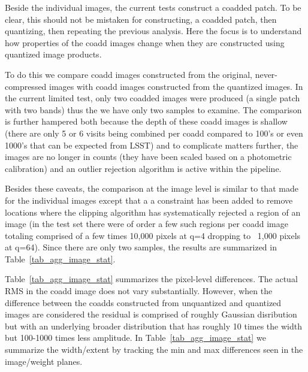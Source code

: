 Beside the individual images, the current tests construct a coadded patch.  
To be clear, this should not be mistaken for constructing, a coadded patch, 
then quantizing, then repeating the previous analysis.  Here the focus is to
understand how properties of the coadd images change when they are constructed
using quantized image products. 

To do this we compare coadd images constructed from the original, 
never-compressed images with coadd images constructed from the quantized images.
In the current limited test, only two coadded images were produced (a single patch 
with two bands) thus the we have only two samples to examine. 
The comparison is further hampered both because the depth of these coadd images 
is shallow (there are only 5 or 6 visits being combined per coadd compared to 100's 
or even 1000's that can be expected from LSST) and to complicate matters further,
the images are no longer in counts (they have been scaled based on a photometric
calibration) and an outlier rejection algorithm is active within the pipeline. 

Besides these caveats, the comparison at the image level is similar to that made for 
the individual images except that a a constraint has been added to 
remove locations where the clipping algorithm has systematically rejected a region 
of an image (in the test set there were of order a few such regions per coadd image
totaling comprised of a few times 10,000 pixels at q=4 dropping to ~1,000 pixels at q=64).
Since there are only two samples, the results are summarized in Table~\ref{tab_agg_image_stat}.


Table~\ref{tab_agg_image_stat} summarizes the pixel-level differences.  The actual RMS
in the coadd image does not vary substantially.  However, when the difference between
the coadds constructed from unquantized and quantized images are considered the residual
is comprised of roughly Gaussian disribution but with an underlying broader distribution
that has roughly 10 times the width but 100-1000 times less amplitude.  In Table~\ref{tab_agg_image_stat}
we summarize the width/extent by tracking the min and max differences seen in the image/weight
planes.

